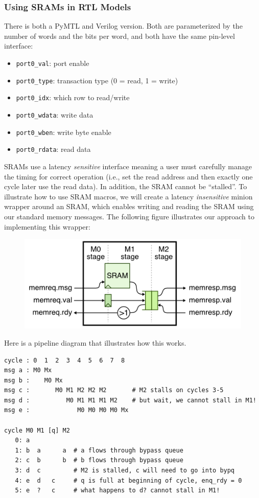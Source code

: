 \documentclass[a4paper,12pt,twoside]{article}
\begin{document}
\subsubsection{Using SRAMs in RTL Models}
There is both a PyMTL and Verilog version. Both are parameterized by the number of words and the bits per word, and both have the same pin-level interface:
\begin{itemize}
    \item \texttt{port0\_val}: port enable
    \item \texttt{port0\_type}: transaction type (0 = read, 1 = write)
    \item \texttt{port0\_idx}: which row to read/write
    \item \texttt{port0\_wdata}: write data
    \item \texttt{port0\_wben}: write byte enable
    \item \texttt{port0\_rdata}: read data
\end{itemize}
SRAMs use a latency \textit{sensitive} interface meaning a user must carefully manage the timing for correct operation (i.e., set the read address and then exactly one cycle later use the read data). In addition, the SRAM cannot be “stalled”. To illustrate how to use SRAM macros, we will create a latency \textit{insensitive} minion wrapper around an SRAM, which enables writing and reading the SRAM using our standard memory messages. The following figure illustrates our approach to implementing this wrapper:
\begin{figure}[H]
    \centering
    \includegraphics[width=\textwidth]{images/15.png}
\end{figure}
Here is a pipeline diagram that illustrates how this works.
\begin{verbatim}
cycle : 0  1  2  3  4  5  6  7  8
msg a : M0 Mx
msg b :    M0 Mx
msg c :       M0 M1 M2 M2 M2       # M2 stalls on cycles 3-5
msg d :          M0 M1 M1 M1 M2    # but wait, we cannot stall in M1!
msg e :             M0 M0 M0 M0 Mx

cycle M0 M1 [q] M2
   0: a
   1: b  a      a  # a flows through bypass queue
   2: c  b      b  # b flows through bypass queue
   3: d  c         # M2 is stalled, c will need to go into bypq
   4: e  d   c     # q is full at beginning of cycle, enq_rdy = 0
   5: e  ?   c     # what happens to d? cannot stall in M1!
\end{verbatim}
\end{document}
